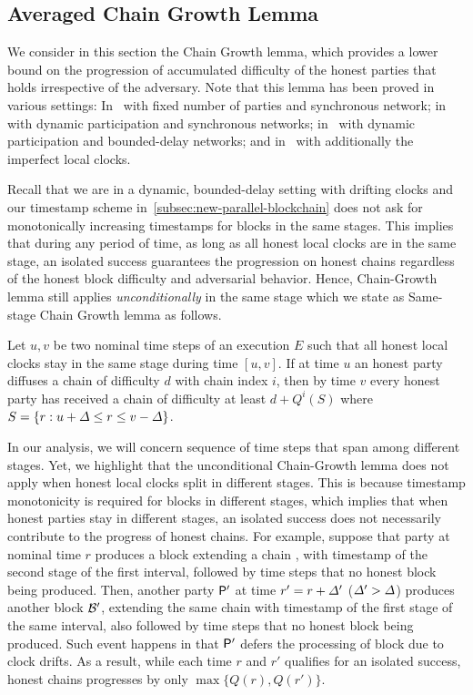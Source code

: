 \subsection{Averaged Chain Growth Lemma}
\label{subsec:chain-growth-lemma}

We consider in this section the Chain Growth lemma, which provides a lower bound on the progression of accumulated difficulty of the honest parties that holds irrespective of the adversary.
%
Note that this lemma has been proved in various settings:
%
In~\cite{EPRINT:GarKiaLeo14} with fixed number of parties and synchronous network; in~\cite{C:GarKiaLeo17} with dynamic participation and synchronous networks; in~\cite{EPRINT:GarKiaLeo20} with dynamic participation and bounded-delay networks; and in~\cite{TCC:GarKiaShe22} with additionally the imperfect local clocks.

Recall that we are in a dynamic, bounded-delay setting with drifting clocks and our timestamp scheme in~\cref{subsec:new-parallel-blockchain} does not ask for monotonically increasing timestamps for blocks in the same stages.
%
This implies that during any period of time, as long as all honest local clocks are in the same stage, an isolated success guarantees the progression on honest chains regardless of the honest block difficulty and adversarial behavior.
%
Hence, Chain-Growth lemma still applies \emph{unconditionally} in the same stage which we state as Same-stage Chain Growth lemma as follows.

\begin{lemma}
    Let $u, v$ be two nominal time steps of an execution $E$ such that all honest local clocks stay in the same stage during time $[u, v]$.
    If at time $u$ an honest party diffuses a chain of difficulty $d$ with chain index $i$, then by time $v$ every honest party has received a chain of difficulty at least $d + Q^i(S)$ where $S = \{r : u + \varDelta \le r \le v - \varDelta \}$.
\end{lemma}

In our analysis, we will concern sequence of time steps that span among different stages.
%
Yet, we highlight that the unconditional Chain-Growth lemma does not apply when honest local clocks split in different stages.
%
This is because timestamp monotonicity is required for blocks in different stages, which implies that when honest parties stay in different stages, an isolated success does not necessarily contribute to the progress of honest chains.
%
For example, suppose that party \party at nominal time $r$ produces a block \block extending a chain \chain, with timestamp of the second stage of the first interval, followed by \delay time steps that no honest block being produced.
%
Then, another party $\mathsf{P}'$ at time $r' = r + \varDelta'$ ($\varDelta' > \varDelta$) produces another block $\mathcal{B}'$, extending the same chain \chain with timestamp of the first stage of the same interval, also followed by \delay time steps that no honest block being produced.
%
Such event happens in that $\mathsf{P}'$ defers the processing of block \block due to clock drifts.
%
As a result, while each time $r$ and $r'$ qualifies for an isolated success, honest chains progresses by only $\max \{Q(r), Q(r')\}$.

